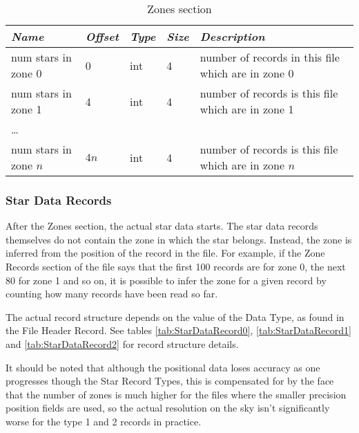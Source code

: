 \begin{table}[htbp]
\begin{tabularx}{\textwidth}{llllX}\toprule
\emph{Name} & \emph{Offset} & \emph{Type} & \emph{Size} &\emph{Description}\\\midrule
num stars in zone 0   & 0    & int & 4 &  number of records in this file which are in zone 0\\%
num stars in zone 1   & 4    & int & 4 &  number of records is this file which are in zone 1\\
\ldots                &      &     &   &\\
num stars in zone $n$ & $4n$ & int & 4 &  number of records is this file which are in zone $n$\\\bottomrule
\end{tabularx}
\caption{Zones section}
\label{tab:Catalogues:stars:record:zones}
\end{table}

\subsubsection{Star Data Records}%
\label{sec:Catalogues:stars:record:data}

After the Zones section, the actual star data starts. The star data
records themselves do not contain the zone in which the star belongs.
Instead, the zone is inferred from the position of the record in the
file. For example, if the Zone Records section of the file says that the
first 100 records are for zone 0, the next 80 for zone 1 and so on, it
is possible to infer the zone for a given record by counting how many
records have been read so far.

The actual record structure depends on the value of the Data Type, as
found in the File Header Record.
See tables 
\ref{tab:StarDataRecord0}, \ref{tab:StarDataRecord1} and \ref{tab:StarDataRecord2}
for record structure details.

It should be noted that although the positional data loses accuracy as
one progresses though the Star Record Types, this is compensated for by
the face that the number of zones is much higher for the files where the
smaller precision position fields are used, so the actual resolution on
the sky isn't significantly worse for the type 1 and 2 records in
practice.

